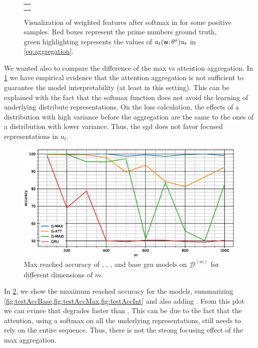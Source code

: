 \begin{figure}
  \centering
  \footnotesize
  \begin{tabular}{|p{\floatwidth}|}
    \hline
    \\
    \hline
    \\
    \hline
    \\
    \hline
  \end{tabular}
  \caption{Visualization of weighted features after softmax in
    \softmaxi{} for some
    positive samples. Red boxes represent the prime numbers ground
    truth, green highlighting represents the values of
    $a_t(\bm{u};\theta^a)u_t$ in
    \eqref{eq:aggregation}.}
  \label{fig:testAttentionSoft}
\end{figure}
We wanted also to compare the difference of the max vs attention
aggregation. In 
\cref{fig:testAttentionSoft} we have empirical evidence that the
attention aggregation is not sufficient to guarantee the model
interpretability (at least in this setting). This can be explained
with the fact that the softmax function does 
not avoid the learning of underlying
distribute representations. 
On the loss calculation, the effects of a
distribution with high variance before the aggregation are the 
same to the ones of a distribution with lower variance. Thus, the \ac{sgd} does
not favor focused representations in $u_t$.

\begin{figure}
  \centering
  \includegraphics[width=\floatwidth]{imgMax/maxBaseDiff.eps}
  \caption{Max reached accuracy of \maxp{}, \softmax{}, \maxi{}, and
    base \ac{gru} models on
    $\mathcal{D}^{(m)}$ for different dimensions of $m$.} 
  \label{fig:testAccDiff}
\end{figure}
In \cref{fig:testAccDiff}, we show the maximum reached accuracy for the
models, summarizing
\cref{fig:testAccBase,fig:testAccMax,fig:testAccInt} and also adding
\softmax{}. From this plot we can evince that \softmax{} degrades
faster than \maxp{}. This can be due to the fact that the attention,
using a softmax on all the underlying representations,
still needs to rely on the entire sequence. Thus, there is not the
strong focusing effect of the max aggregation.


